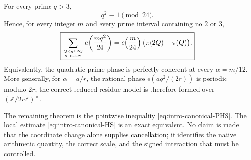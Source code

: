 \begin{theorem}
\label{thm:intro-prime-square-24}
For every prime $q>3$,
\[
 \boxed{q^2\equiv1\pmod{24}.}
\]
Hence, for every integer $m$ and every prime interval containing no $2$ or $3$,
\[
 \boxed{
 \sum_{Q<q\le2Q\atop q\ {\rm prime}}
 e\!\left(\frac{m q^2}{24}\right)
 =e\!\left(\frac m{24}\right)
 \bigl(\pi(2Q)-\pi(Q)\bigr).
 }
\]
Equivalently, the quadratic prime phase is perfectly coherent at every
$\alpha=m/12$.  More generally, for $\alpha=a/r$, the rational phase
$e(aq^2/(2r))$ is periodic modulo $2r$; the correct reduced-residue model is therefore formed over $(\mathbb Z/2r\mathbb Z)^\times$.
\end{theorem}

The remaining theorem is the pointwise inequality \eqref{eq:intro-canonical-PHS}.  The local estimate \eqref{eq:intro-canonical-HS} is an exact equivalent.  No claim is made that the coordinate change alone supplies cancellation; it identifies the native arithmetic quantity, the correct scale, and the signed interaction that must be controlled.

